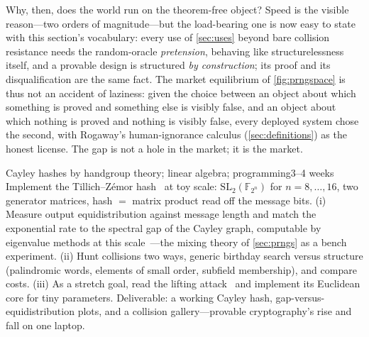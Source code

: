 Why, then, does the world run on the theorem-free object? Speed is the
visible reason---two orders of magnitude---but the load-bearing one is
now easy to state with this section's vocabulary: every use of
\cref{sec:uses} beyond bare collision resistance needs the
random-oracle \emph{pretension}, behaving like structurelessness
itself, and a provable design is structured \emph{by construction};
its proof and its disqualification are the same fact. The market
equilibrium of \cref{fig:prngspace} is thus not an accident of
laziness: given the choice between an object about which something is
proved and something else is visibly false, and an object about which
nothing is proved and nothing is visibly false, every deployed system
chose the second, with Rogaway's human-ignorance calculus
(\cref{sec:definitions}) as the honest license. The gap is not a hole
in the market; it is the market.

\begin{project}{Cayley hashes by hand}{group theory; linear algebra;
  programming}{3--4 weeks}
  Implement the Tillich--Z{\'e}mor hash~\citep{TillichZemor1994} at toy
  scale: $\mathrm{SL}_2(\mathbb{F}_{2^n})$ for $n = 8, \dots, 16$, two
  generator matrices, hash $=$ matrix product read off the message
  bits. (i) Measure output equidistribution against message length and
  match the exponential rate to the spectral gap of the Cayley graph,
  computable by eigenvalue methods at this
  scale~\citep{HooryLinialWigderson2006}---the mixing theory of
  \cref{sec:prngs} as a bench experiment. (ii) Hunt collisions two
  ways, generic birthday search versus structure (palindromic words,
  elements of small order, subfield membership), and compare costs.
  (iii) As a stretch goal, read the lifting attack~\citep{TillichZemor2008}
  and implement its Euclidean core for tiny parameters. Deliverable: a
  working Cayley hash, gap-versus-equidistribution plots, and a
  collision gallery---provable cryptography's rise and fall on one
  laptop.
\end{project}

